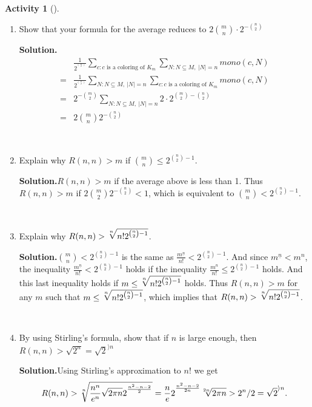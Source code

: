 \documentclass[10pt,]{book}
\theoremstyle{plain}
\theoremstyle{definition}
\newtheorem{activity}[project]{Activity}
\numberwithin{equation}{chapter}
\newcommand{\lt}{<}
\newcommand{\amp}{&}
\begin{document}
\begin{activity}[]
\begin{enumerate}[label=(\alph*)]
~\par
\item Show that your formula for the average reduces to \(2\binom{m}{n}\cdot2^{-\binom{n}{2}}\)%
\par\medskip\noindent%
\textbf{Solution.}\quad %
\begin{align*}
\amp \frac{1}{2^{^\binom{m}{2}}}\sum_{c:c\mbox{~is a coloring
of~} K_m}\sum_{N:N\subseteq M,~|N|=n}{ mono}(c,N)\\
=\amp \frac{1}{2^{^\binom{m}{2}}} \sum_{N:N\subseteq
M,~|N|=n}\sum_{c:c\mbox{~is a coloring of~} K_m}{ mono}(c,N)\\
=\amp
2^{-\binom{m}{2}}\sum_{N:N\subseteq
M,~|N|=n}2\cdot2^{\binom{m}{2}-\binom{n}{2}}\\
=\amp  2\binom{m}{n}2^{-\binom{n}{2}}
\end{align*}

~\par
\item Explain why \(R(n,n)>m\) if \(\binom{m}{n}\le 2^{\binom{n}{2} -1}\).%
\par\medskip\noindent%
\textbf{Solution.}\quad \(R(n,n)>m\) if the average above is less than 1. Thus \(R(n,n)>m\) if \(2\binom{m}{2}2^{-\binom{n}{2}}\lt 1\), which is equivalent to \(\binom{m}{n}\lt 2^{\binom{n}{2}-1}\).%

~\par
\item Explain why \(R(n,n)>\root n \of {n!2^{\binom{n}{2}-1}}\).%
\par\medskip\noindent%
\textbf{Solution.}\quad \(\binom{m}{n} \lt 2^{\binom{n}{2}-1}\) is the same as \(\frac{m^{\underline{n}}}{n!}\lt 2^{\binom{n}{2}-1}\). And since \(m^{\underline{n}}\lt m^n\), the inequality \(\frac{m^{\underline{n}}}{n!}\lt  2^{\binom{n}{2}-1}\) holds if the inequality \(\frac{m^n}{n!}\le2^{\binom{n}{2}-1}\) holds. And this last inequality holds if \(m\le\root n
\of {n!2^{\binom{n}{2}-1}}\) holds. Thus \(R(n,n)>m\) for any \(m\) such that \(m\le\root n
\of {n!2^{\binom{n}{2}-1}}\), which implies that \(R(n,n)> \root n
\of {n!2^{\binom{n}{2}-1}}\).%

~\par
\item By using Stirling's formula, show that if \(n\) is large enough, then \(R(n,n) > \sqrt{2^n} = \sqrt{2}^{\rangle n}\)%
\par\medskip\noindent%
\textbf{Solution.}\quad Using Stirling's approximation to \(n!\) we get%
\begin{equation*}
R(n,n)>\root n \of
{\frac{n^n}{e^n}\sqrt{2\pi n}2^{^\frac{n^2-n-2}{2}}}=\frac{n}{e}2^{^\frac{n^2-n-2}{2n}}\root 2n \of{2\pi
n}>2^n/2=\sqrt{2}^{\rangle n}.
\end{equation*}
%

\end{enumerate}
\end{activity}
\typeout{************************************************}
\typeout{************************************************}
\end{document}
